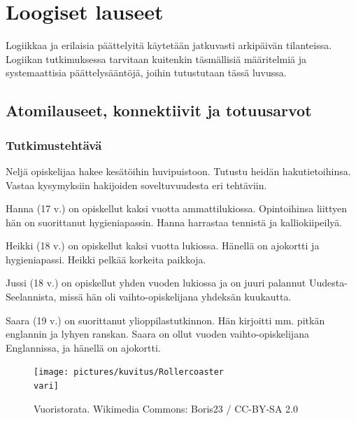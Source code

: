 \chapter{Loogiset lauseet}

Logiikkaa ja erilaisia päättelyitä käytetään jatkuvasti arkipäivän tilanteissa. Logiikan tutkimuksessa tarvitaan kuitenkin täsmällisiä määritelmiä ja systemaattisia päättelysääntöjä, joihin tutustutaan tässä luvussa.

\section{Atomilauseet, konnektiivit ja totuusarvot}
\label{konnektiivit}

\subsection*{Tutkimustehtävä}
Neljä opiskelijaa hakee kesätöihin huvipuistoon. Tutustu heidän hakutietoihinsa. Vastaa kysymyksiin hakijoiden soveltuvuudesta eri tehtäviin.

Hanna (17 v.) on opiskellut kaksi vuotta ammattilukiossa. Opintoihinsa liittyen hän on suorittanut hygieniapassin. Hanna harrastaa tennistä ja kalliokiipeilyä.

Heikki (18 v.) on opiskellut kaksi vuotta lukiossa. Hänellä on ajokortti ja hygieniapassi. Heikki pelkää korkeita paikkoja.

Jussi (18 v.) on opiskellut yhden vuoden lukiossa ja on juuri palannut Uudesta-Seelannista, missä hän oli vaihto-opiskelijana yhdeksän kuukautta.

Saara (19 v.) on suorittanut ylioppilastutkinnon. Hän kirjoitti mm. pitkän englannin ja lyhyen ranskan. Saara on ollut vuoden vaihto-opiskelijana Englannissa, ja hänellä on ajokortti.


\begin{figure}[h!]
	\centering
	\texttt{[image: pictures/kuvitus/Rollercoaster\\vari]}
	\caption{Vuoristorata. Wikimedia Commons: Boris23 / CC-BY-SA 2.0}
\end{figure}

